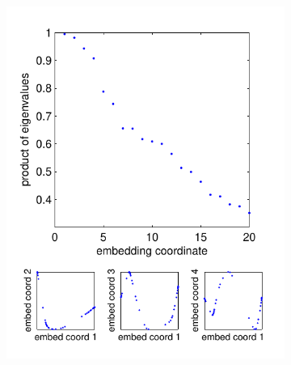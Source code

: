 \begin{figure}
\centering
\begin{subfigure}{0.22\textwidth}
\includegraphics[width=\textwidth]{figS3}
\caption{}
\end{subfigure}
\begin{subfigure}{0.22\textwidth}

\end{subfigure}
\end{figure}
